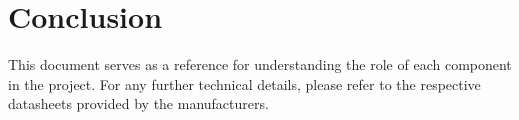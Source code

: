 \documentclass[a4paper,8pt]{article}
\begin{document}
%
%
%
%
%
%
%
%
%
  \section*{Conclusion}

  This document serves as a reference for understanding the role of each
  component in the project. For any further technical details, please
  refer to the respective datasheets provided by the manufacturers.

  \newpage
   
\end{document}
